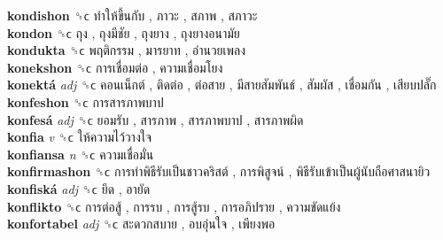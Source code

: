 \textbf{kondishon} ␝ϲ   ทำให้ขึ้นกับ ,  ภาวะ ,  สภาพ ,  สภาวะ   \\
\textbf{kondon} ␝ϲ   ถุง ,  ถุงมีชัย ,  ถุงยาง ,  ถุงยางอนามัย   \\
\textbf{kondukta} ␝ϲ   พฤติกรรม ,  มารยาท ,  อำนวยเพลง   \\
\textbf{konekshon} ␝ϲ   การเชื่อมต่อ ,  ความเชื่อมโยง   \\
\textbf{konektá} \emph{adj}  ␝ϲ   คอนเน็กต์ ,  ติดต่อ ,  ต่อสาย ,  มีสายสัมพันธ์ ,  สัมผัส ,  เชื่อมกัน ,  เสียบปลั๊ก   \\
\textbf{konfeshon} ␝ϲ   การสารภาพบาป   \\
\textbf{konfesá} \emph{adj}  ␝ϲ   ยอมรับ ,  สารภาพ ,  สารภาพบาป ,  สารภาพผิด   \\
\textbf{konfia} \emph{v}  ␝ϲ   ให้ความไว้วางใจ   \\
\textbf{konfiansa} \emph{n}  ␝ϲ   ความเชื่อมั่น   \\
\textbf{konfirmashon} ␝ϲ   การทำพิธีรับเป็นชาวคริสต์ ,  การพิสูจน์ ,  พิธีรับเข้าเป็นผู้นับถือศาสนายิว   \\
\textbf{konfiská} \emph{adj}  ␝ϲ   ยึด ,  อายัด   \\
\textbf{konflikto} ␝ϲ   การต่อสู้ ,  การรบ ,  การสู้รบ ,  การอภิปราย ,  ความขัดแย้ง   \\
\textbf{konfortabel} \emph{adj}  ␝ϲ   สะดวกสบาย ,  อบอุ่นใจ ,  เพียงพอ   \\

